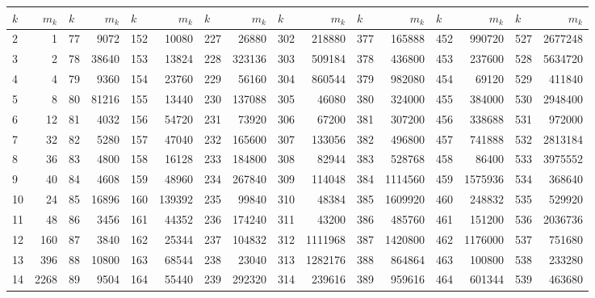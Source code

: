 \documentclass[11pt]{amsart}
\theoremstyle{remark}
\theoremstyle{plain}
\numberwithin{equation}{section}
\renewcommand{\(}{\left(}
\renewcommand{\)}{\right)}
\begin{document}

\afterpage{\clearpage}
{\tiny
\begin{table}
\begin{tabular}{|lr|lr|lr|lr|lr|lr|lr|lr|}
\hline
 $ k$ & $ m_k$\hfil
& $ k$ & $ m_k$\hfil
& $ k$ & $ m_k$\hfil
& $ k$ & $ m_k$\hfil
& $ k$ & $ m_k$\hfil
& $ k$ & $ m_k$\hfil
& $ k$ & $ m_k$\hfil
& $ k$ & $ m_k$\hfil\\
\hline
    2 & 1 &   77 & 9072 &  152 & 10080 &  227 & 26880 &  302 & 218880 &  377 & 165888 &  452 & 990720 &  527 & 2677248 \\
    3 & 2 &   78 & 38640 &  153 & 13824 &  228 & 323136 &  303 & 509184 &  378 & 436800 &  453 & 237600 &  528 & 5634720 \\
    4 & 4 &   79 & 9360 &  154 & 23760 &  229 & 56160 &  304 & 860544 &  379 & 982080 &  454 & 69120 &  529 & 411840 \\
    5 & 8 &   80 & 81216 &  155 & 13440 &  230 & 137088 &  305 & 46080 &  380 & 324000 &  455 & 384000 &  530 & 2948400 \\
    6 & 12 &   81 & 4032 &  156 & 54720 &  231 & 73920 &  306 & 67200 &  381 & 307200 &  456 & 338688 &  531 & 972000 \\
    7 & 32 &   82 & 5280 &  157 & 47040 &  232 & 165600 &  307 & 133056 &  382 & 496800 &  457 & 741888 &  532 & 2813184 \\
    8 & 36 &   83 & 4800 &  158 & 16128 &  233 & 184800 &  308 & 82944 &  383 & 528768 &  458 & 86400 &  533 & 3975552 \\
    9 & 40 &   84 & 4608 &  159 & 48960 &  234 & 267840 &  309 & 114048 &  384 & 1114560 &  459 & 1575936 &  534 & 368640 \\
   10 & 24 &   85 & 16896 &  160 & 139392 &  235 & 99840 &  310 & 48384 &  385 & 1609920 &  460 & 248832 &  535 & 529920 \\
   11 & 48 &   86 & 3456 &  161 & 44352 &  236 & 174240 &  311 & 43200 &  386 & 485760 &  461 & 151200 &  536 & 2036736 \\
   12 & 160 &   87 & 3840 &  162 & 25344 &  237 & 104832 &  312 & 1111968 &  387 & 1420800 &  462 & 1176000 &  537 & 751680 \\
   13 & 396 &   88 & 10800 &  163 & 68544 &  238 & 23040 &  313 & 1282176 &  388 & 864864 &  463 & 100800 &  538 & 233280 \\
   14 & 2268 &   89 & 9504 &  164 & 55440 &  239 & 292320 &  314 & 239616 &  389 & 959616 &  464 & 601344 &  539 & 463680 \\

\end{tabular}
\end{table}}
\end{document}
